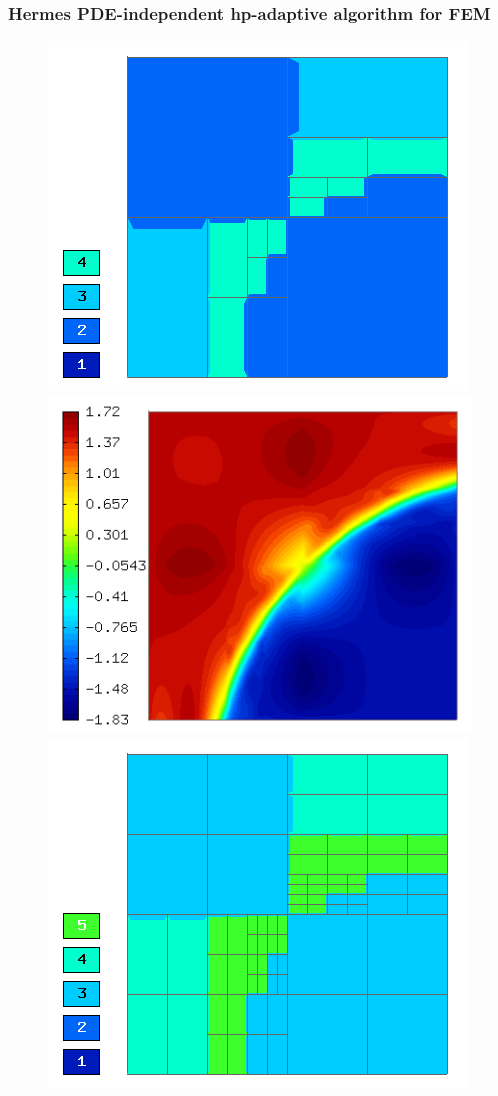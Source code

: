 \documentclass{beamer}
\begin{document}
\begin{frame}
\frametitle{Hermes PDE-independent hp-adaptive algorithm for FEM}
\begin{center}
\begin{figure}[t]
\includegraphics[width=0.42\textheight]{refsln/screen005.png}
\includegraphics[width=0.42\textheight]{refsln/screen004.png}
\includegraphics[width=0.42\textheight]{refsln/screen006.png}

\end{figure}
\end{center}
\end{frame}
\end{document}
